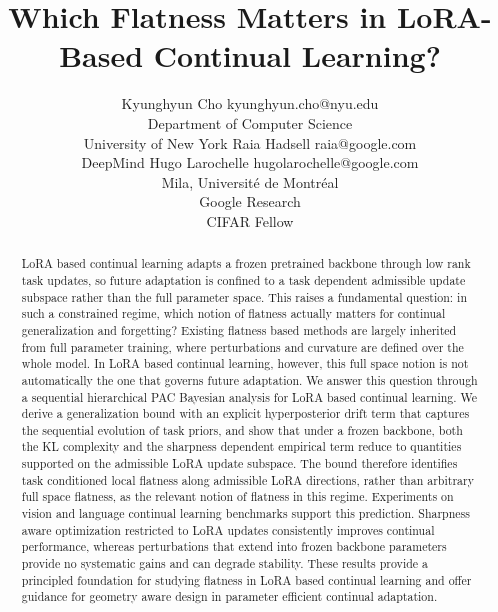 \documentclass[10pt]{article} %
\title{Which Flatness Matters in LoRA-Based Continual Learning?}
\author{\name Kyunghyun Cho \email kyunghyun.cho@nyu.edu \\
      \addr Department of Computer Science\\
      University of New York
      \AND
      \name Raia Hadsell \email raia@google.com \\
      \addr DeepMind
      \AND
      \name Hugo Larochelle \email hugolarochelle@google.com\\
      \addr Mila, Universit\'e de Montr\'eal \\
      Google Research\\
      CIFAR Fellow}
\begin{document}
\maketitle

\begin{abstract}



LoRA based continual learning adapts a frozen pretrained backbone through low rank task updates, so future adaptation is confined to a task dependent admissible update subspace rather than the full parameter space. This raises a fundamental question: in such a constrained regime, which notion of flatness actually matters for continual generalization and forgetting? Existing flatness based methods are largely inherited from full parameter training, where perturbations and curvature are defined over the whole model. In LoRA based continual learning, however, this full space notion is not automatically the one that governs future adaptation.
We answer this question through a sequential hierarchical PAC Bayesian analysis for LoRA based continual learning. We derive a generalization bound with an explicit hyperposterior drift term that captures the sequential evolution of task priors, and show that under a frozen backbone, both the KL complexity and the sharpness dependent empirical term reduce to quantities supported on the admissible LoRA update subspace. The bound therefore identifies task conditioned local flatness along admissible LoRA directions, rather than arbitrary full space flatness, as the relevant notion of flatness in this regime.
Experiments on vision and language continual learning benchmarks support this prediction. Sharpness aware optimization restricted to LoRA updates consistently improves continual performance, whereas perturbations that extend into frozen backbone parameters provide no systematic gains and can degrade stability. These results provide a principled foundation for studying flatness in LoRA based continual learning and offer guidance for geometry aware design in parameter efficient continual adaptation.




\end{abstract}
\end{document}
